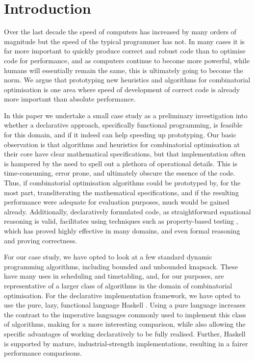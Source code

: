 \section{Introduction}

Over the last decade the speed of computers has increased by many orders of
magnitude but the speed of the typical programmer has not. In many cases it is
far more important to quickly produce correct and robust code than to optimise
code for performance, and as computers continue to become more powerful, while
humans will essentially remain the same, this is ultimately going to become
the norm. We argue that prototyping new heuristics and algorithms for
combinatorial optimisation is one area where speed of development of correct
code is already more important than absolute performance.

In this paper we undertake a small case study as a preliminary investigation
into whether a declarative approach, specifically functional programming, is
feasible for this domain, and if it indeed can help speeding up prototyping.
Our basic observation is that algorithms and heuristics for combinatorial
optimisation at their core have clear mathematical specifications, but that
implementation often is hampered by the need to spell out a plethora of
operational details. This is time-consuming, error prone, and ultimately
obscure the essence of the code. Thus, if combinatorial optimisation
algorithms could be prototyped by, for the most part, transliterating the
mathematical specifications, and if the resulting performance were adequate
for evaluation purposes, much would be gained already. Additionally,
declaratively formulated code, as straightforward equational reasoning is
valid, facilitates using techniques such as property-based testing
\cite{quickcheck}, which has proved highly effective in many domains, and even
formal reasoning and proving correctness.

For our case study, we have opted to look at a few standard dynamic
programming algorithms, including bounded and unbounded knapsack. These have
many uses in scheduling and timetabling, and, for our purposes, are
representative of a larger class of algorithms in the domain of combinatorial
optimisation. For the declarative implementation framework, we have opted to
use the pure, lazy, functional language Haskell \cite{Haskell98Book}. Using a
pure language increases the contrast to the imperative languages commonly used
to implement this class of algorithms, making for a more interesting
comparison, while also allowing the specific advantages of working
declaratively
to be fully realised. Further, Haskell is supported by mature,
industrial-strength implementations, resulting in a fairer performance
comparisons.

